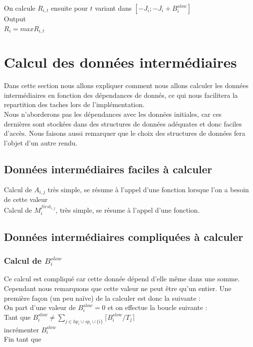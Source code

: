 \documentclass[10pt,a4paper]{article}
\begin{document}
On calcule $R_{i,t}$ ensuite pour $t$ variant dans $[-J_i;-J_i+B_i^{slow}]$\\

Output\\
$R_{i} = max R_{i,t}$\\



\section{Calcul des données intermédiaires}
Dans cette section nous allons expliquer comment nous allons calculer les données 
intermédiaires en fonction des dépendances de donnés, ce qui nous facilitera la repartition 
des taches lors de l'implémentation.\\
Nous n'aborderons pas les dépendances avec les données initiales, car ces dernières sont stockées 
dans des structures de données adéquates et donc faciles d'accès.
Nous faisons aussi remarquer que le choix des structures de données fera 
l'objet d'un autre rendu.

\subsection{Données intermédiaires faciles à calculer}
Calcul de $A_{i,j}$ très simple, se résume à l'appel d'une fonction lorsque l'on a besoin de 
cette valeur\\
Calcul de $M_{i}^{first_{i,j}}$, très simple, se résume à l'appel d'une fonction.

\subsection{Données intermédiaires compliquées à calculer}

\subsubsection{Calcul de $B_i^{slow}$}
Ce calcul est compliqué car cette donnée dépend d'elle même dans une somme. Cependant 
nous remarquons que cette valeur ne peut être qu'un entier. Une première façon (un peu naïve) 
de la calculer est donc la suivante :\\
\linebreak
On part d'une valeur de $B_i^{slow} = 0$ et on effectue la boucle suivante :\\
Tant que $B_i^{slow} \neq \sum \limits _{j \in hp_i \cup sp_i \cup \{i\}} 
\lceil B_i^{slow}/T_ j\rceil$\\
\hspace{4em} incrémenter $B_i^{slow}$\\
Fin tant que\\
\end{document}
